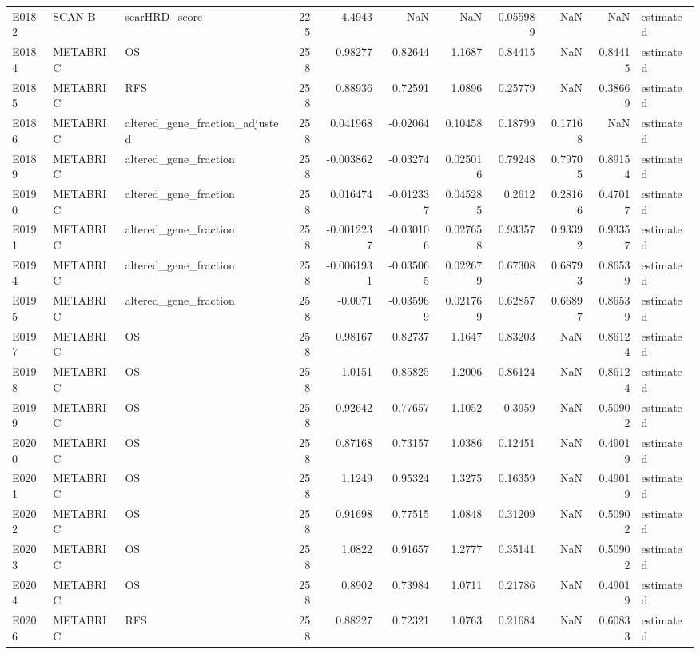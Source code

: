\begin{longtable}{lllrrrrrrrl}
E0182 & SCAN-B & scarHRD\_score & 225 & 4.4943 & NaN & NaN & 0.055989 & NaN & NaN & estimated \\
E0184 & METABRIC & OS & 258 & 0.98277 & 0.82644 & 1.1687 & 0.84415 & NaN & 0.84415 & estimated \\
E0185 & METABRIC & RFS & 258 & 0.88936 & 0.72591 & 1.0896 & 0.25779 & NaN & 0.38669 & estimated \\
E0186 & METABRIC & altered\_gene\_fraction\_adjusted & 258 & 0.041968 & -0.02064 & 0.10458 & 0.18799 & 0.17168 & NaN & estimated \\
E0189 & METABRIC & altered\_gene\_fraction & 258 & -0.003862 & -0.03274 & 0.025016 & 0.79248 & 0.79705 & 0.89154 & estimated \\
E0190 & METABRIC & altered\_gene\_fraction & 258 & 0.016474 & -0.012337 & 0.045285 & 0.2612 & 0.28166 & 0.47017 & estimated \\
E0191 & METABRIC & altered\_gene\_fraction & 258 & -0.0012237 & -0.030106 & 0.027658 & 0.93357 & 0.93392 & 0.93357 & estimated \\
E0194 & METABRIC & altered\_gene\_fraction & 258 & -0.0061931 & -0.035065 & 0.022679 & 0.67308 & 0.68793 & 0.86539 & estimated \\
E0195 & METABRIC & altered\_gene\_fraction & 258 & -0.0071 & -0.035969 & 0.021769 & 0.62857 & 0.66897 & 0.86539 & estimated \\
E0197 & METABRIC & OS & 258 & 0.98167 & 0.82737 & 1.1647 & 0.83203 & NaN & 0.86124 & estimated \\
E0198 & METABRIC & OS & 258 & 1.0151 & 0.85825 & 1.2006 & 0.86124 & NaN & 0.86124 & estimated \\
E0199 & METABRIC & OS & 258 & 0.92642 & 0.77657 & 1.1052 & 0.3959 & NaN & 0.50902 & estimated \\
E0200 & METABRIC & OS & 258 & 0.87168 & 0.73157 & 1.0386 & 0.12451 & NaN & 0.49019 & estimated \\
E0201 & METABRIC & OS & 258 & 1.1249 & 0.95324 & 1.3275 & 0.16359 & NaN & 0.49019 & estimated \\
E0202 & METABRIC & OS & 258 & 0.91698 & 0.77515 & 1.0848 & 0.31209 & NaN & 0.50902 & estimated \\
E0203 & METABRIC & OS & 258 & 1.0822 & 0.91657 & 1.2777 & 0.35141 & NaN & 0.50902 & estimated \\
E0204 & METABRIC & OS & 258 & 0.8902 & 0.73984 & 1.0711 & 0.21786 & NaN & 0.49019 & estimated \\
E0206 & METABRIC & RFS & 258 & 0.88227 & 0.72321 & 1.0763 & 0.21684 & NaN & 0.60833 & estimated \\

\end{longtable}
